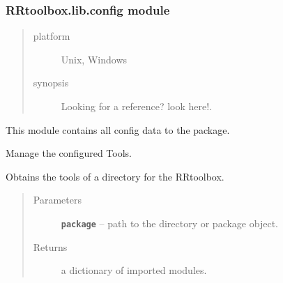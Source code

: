 \documentclass[letterpaper,10pt,english]{sphinxmanual}
\begin{document}
\subsubsection{RRtoolbox.lib.config module}
\label{RRtoolbox.lib:module-RRtoolbox.lib.config}\label{RRtoolbox.lib:rrtoolbox-lib-config-module}\begin{quote}\begin{description}
\item[{platform}] \leavevmode
Unix, Windows

\item[{synopsis}] \leavevmode
Looking for a reference? look here!.

\end{description}\end{quote}

This module contains all config data to the package.

\begin{fulllineitems}
\label{RRtoolbox.lib:RRtoolbox.lib.config.ConfigTool}
Manage the configured Tools.

\begin{fulllineitems}
\label{RRtoolbox.lib:RRtoolbox.lib.config.ConfigTool.getTools}
Obtains the tools of a directory for the RRtoolbox.
\begin{quote}\begin{description}
\item[{Parameters}] \leavevmode
\textbf{\texttt{package}} -- path to the directory or package object.

\item[{Returns}] \leavevmode
a dictionary of imported modules.

\end{description}\end{quote}

\end{fulllineitems}


\end{fulllineitems}

\end{document}
